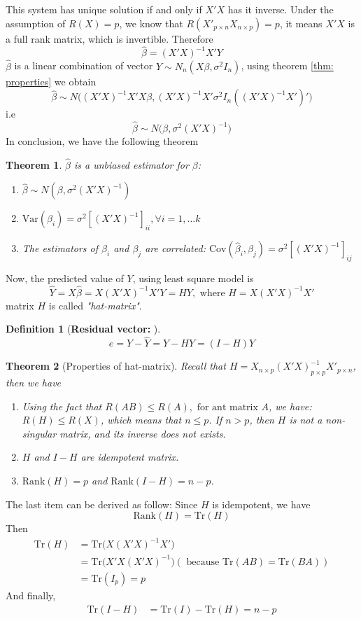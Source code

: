 \documentclass[11pt]{article}
\newtheorem{thm}{Theorem}[subsection]
\newtheorem{df}{Definition}[section]
\begin{document}
This system has unique solution if and only if $X'X$ has it inverse. Under the assumption of $R(X) = p$, we know that $R(X'_{p \times n} X_{n \times p}) = p$, it means $X'X$ is a full rank matrix, which is invertible.
Therefore 
\begin{equation}
	\hat{\beta } =  (X'X)^{-1} X'Y\label{eq: beta-matrix}
\end{equation}
$\hat{\beta}$ is a linear combination of vector $Y \sim N_n( X\beta , \sigma^2 I_n)$, using theorem \ref{thm: properties} we obtain 
$$ \hat{\beta} \sim N \bigg((X'X)^{-1} X'X \beta, (X'X)^{-1} X' \sigma^2 I_n ((X'X)^{-1} X')'\bigg)$$
i.e $$ \hat{\beta} \sim N\bigg(\beta,  \sigma^2 (X'X)^{-1}\bigg)$$
 In conclusion, we have the following theorem
\begin{thm} $\hat{\beta}$ is a unbiased estimator for $\beta$: 
	\begin{enumerate}
		\item $\hat{\beta} \sim N(\beta, \sigma^2 (X'X)^{-1})$
		\item $\text{Var}(\hat{\beta}_i) = \sigma^2 \left[(X'X)^{-1}\right]_{ii}, \forall i = 1, \dots k$
		\item The estimators of $\beta_i$ and $\beta_j$ are correlated: $\text{Cov}(\hat{\beta}_i, \hat{\beta}_j) = \sigma^2\left[(X'X)^{-1}\right]_{ij}$
	\end{enumerate}
\end{thm}
Now, the predicted value of $Y$, using least square model is 
$$\hat{Y} = X\hat{\beta} = X (X'X)^{-1} X'Y = HY, \text{ where } H = X(X'X)^{- 1} X'$$
matrix $H$ is called \textit{"hat-matrix"}.
\begin{df}[\textbf{Residual vector: }] 
	$$e = Y - \hat{Y} = Y - H Y = (I - H)Y $$
\end{df}
\begin{thm}[Properties of hat-matrix] Recall that $H = X_{n \times p}(X'X)^{-1}_{p \times p} X'_{p \times n }$, then we have
	
	\begin{enumerate}
		\item Using the fact that $R(AB) \leq R(A), \text{ for ant matrix } A$, we have: $R(H) \leq R(X)$, which means that $n \leq p$.  If $n > p$, then $H$ is not a  non-singular matrix, and its inverse does not exists.
		\item $H$ and $I - H$  are idempotent matrix.
		\item $\text{Rank}(H) = p$ and $\text{Rank}(I - H) = n - p$.
	\end{enumerate}
\end{thm}
The last item can be derived as follow: Since $H$ is idempotent, we have 
$$\text{Rank}(H) = \text{Tr}(H) $$
Then 
\begin{align*}
	\text{Tr}(H) & = \text{Tr}\big(X(X'X)^{-1} X'\big) \\
	& = \text{Tr}\big( X'X(X'X)^{-1}  \big)  (\text{ because }\text{Tr}(AB) = \text{Tr}(BA)) \\
	& = \text{Tr}(I_p) = p
\end{align*}
And finally,
\begin{align*}
	\text{Tr}(I - H) & = \text{Tr}(I) - \text{Tr}(H) = n - p
\end{align*}
\end{document}
